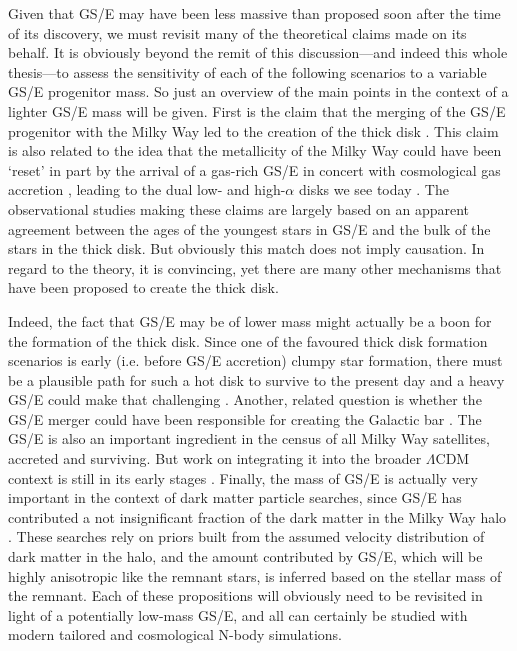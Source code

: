 Given that GS/E may have been less massive than proposed soon after the time of its discovery, we must revisit many of the theoretical claims made on its behalf. It is obviously beyond the remit of this discussion---and indeed this whole thesis---to assess the sensitivity of each of the following scenarios to a variable GS/E progenitor mass. So just an overview of the main points in the context of a lighter GS/E mass will be given. First is the claim that the merging of the GS/E progenitor with the Milky Way led to the creation of the thick disk \parencite[e.g.][]{helmi18,gallart19}. This claim is also related to the idea that the metallicity of the Milky Way could have been `reset' in part by the arrival of a gas-rich GS/E in concert with cosmological gas accretion \parencite[e.g.][]{grand20,renaud21,ciuca24}, leading to the dual low- and high-$\alpha$ disks we see today \parencite[see also the two-infall model of e.g.][]{chiappini97}. The observational studies making these claims are largely based on an apparent agreement between the ages of the youngest stars in GS/E and the bulk of the stars in the thick disk. But obviously this match does not imply causation. In regard to the theory, it is convincing, yet there are many other mechanisms that have been proposed to create the thick disk.

Indeed, the fact that GS/E may be of lower mass might actually be a boon for the formation of the thick disk. Since one of the favoured thick disk formation scenarios is early (i.e. before GS/E accretion) clumpy star formation, there must be a plausible path for such a hot disk to survive to the present day and a heavy GS/E could make that challenging \parencite[see e.g. arguments for this in][]{deason24}. Another, related question is whether the GS/E merger could have been responsible for creating the Galactic bar \parencite{fragkoudi20,merrow23}. The GS/E is also an important ingredient in the census of all Milky Way satellites, accreted and surviving. But work on integrating it into the broader $\Lambda$CDM context is still in its early stages \parencite{fattahi20,naidu22}. Finally, the mass of GS/E is actually very important in the context of dark matter particle searches, since GS/E has contributed a not insignificant fraction of the dark matter in the Milky Way halo \parencite{necib19,evans19}. These searches rely on priors built from the assumed velocity distribution of dark matter in the halo, and the amount contributed by GS/E, which will be highly anisotropic like the remnant stars, is inferred based on the stellar mass of the remnant. Each of these propositions will obviously need to be revisited in light of a potentially low-mass GS/E, and all can certainly be studied with modern tailored and cosmological N-body simulations. 

